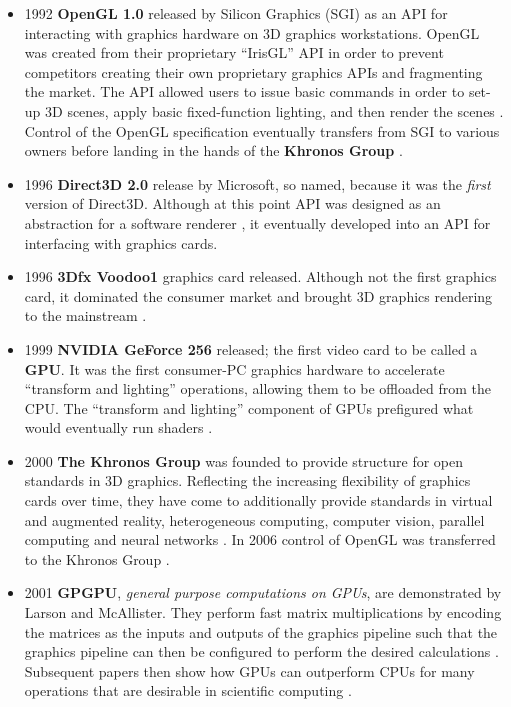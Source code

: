 \documentclass[a4paper,12pt,twoside,openright]{report}
\begin{document}
\begin{itemize}

    \item 1992 \textbf{OpenGL 1.0} released by Silicon Graphics (SGI) as an API
    for interacting with graphics hardware on 3D graphics workstations. OpenGL
    was created from their proprietary ``IrisGL'' API in order to prevent
    competitors creating their own proprietary graphics APIs and fragmenting
    the market. The API allowed users to issue basic commands in order to
    set-up 3D scenes, apply basic fixed-function lighting, and then render the
    scenes \cite{OpenGL_1_0}. Control of the OpenGL specification eventually
    transfers from SGI to various owners before landing in the hands of the
    \textbf{Khronos Group} \cite{OpenGL}.

    \item 1996 \textbf{Direct3D 2.0} release by Microsoft, so named, because it
    was the \textit{first} version of Direct3D. Although at this point API was
    designed as an abstraction for a software renderer
    \cite{JohnCarmackPlanDirect3DvsOpenGl}, it eventually developed into an API
    for interfacing with graphics cards.

    \item 1996 \textbf{3Dfx Voodoo1} graphics card released. Although not the
    first graphics card, it dominated the consumer market and brought 3D
    graphics rendering to the mainstream \cite{Voodoo1}.

    \item 1999 \textbf{NVIDIA GeForce 256} released; the first video card to be
    called a \textbf{GPU}. It was the first consumer-PC graphics hardware to
    accelerate ``transform and lighting'' operations, allowing them to be
    offloaded from the CPU. The ``transform and lighting'' component of GPUs
    prefigured what would eventually run shaders \cite{GeForce256}.

    \item 2000 \textbf{The Khronos Group} was founded to provide structure for
    open standards in 3D graphics. Reflecting the increasing flexibility of
    graphics cards over time, they have come to additionally provide standards
    in virtual and augmented reality, heterogeneous computing, computer vision,
    parallel computing and neural networks \cite{KhronosGroupAbout}. In 2006
    control of OpenGL was transferred to the Khronos Group
    \cite{OpenGLToKhronos}.

    \item 2001 \textbf{GPGPU}, \textit{general purpose computations on GPUs},
    are demonstrated by Larson and McAllister. They perform fast matrix
    multiplications by encoding the matrices as the inputs and outputs of the
    graphics pipeline such that the graphics pipeline can then be configured to
    perform the desired calculations \cite{MatrixGPU}. Subsequent papers then
    show how GPUs can outperform CPUs for many operations that are desirable in
    scientific computing \cite{CUDAtoOpenCL} \cite{Kruger03linearalgebra}
    \cite{LUGPU} \cite{SparsematrixGPU}.


\end{itemize}
\end{document}

